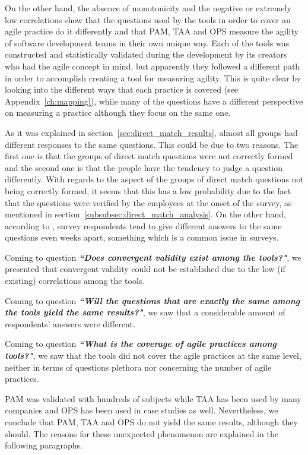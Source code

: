On the other hand, the absence of monotonicity and the negative or extremely low correlations show that the questions used by the tools in order to cover an agile practice do it differently and that \ac{PAM}, \ac{TAA} and \ac{OPS} measure the agility of software development teams in their own unique way. Each of the tools was constructed and statistically validated during the development by its creators who had the agile concept in mind, but apparently they followed a different path in order to accomplish creating a tool for measuring agility. This is quite clear by looking into the different ways that each practice is covered (see Appendix~\ref{ch:mapping}), while many of the questions have a different perspective on measuring a practice although they focus on the same one. 

As it was explained in section~\ref{sec:direct_match_results}, almost all groups had different responses to the same questions. This could be due to two reasons. The first one is that the groups of direct match questions were not correctly formed and the second one is that the people have the tendency to judge a question differently. With regards to the aspect of the groups of direct match questions not being correctly formed, it seems that this has a low probability due to the fact that the questions were verified by the employees at the onset of the survey, as mentioned in section~\ref{subsubsec:direct_match_analysis}. On the other hand, according to \citet{Lacy}, survey respondents tend to give different answers to the same questions even weeks apart, something which is a common issue in surveys.

Coming to question \textbf{\textit{``Does convergent validity exist among the tools?"}}, we presented that convergent validity could not be established due to the low (if existing) correlations among the tools.

Coming to question \textbf{\textit{``Will the questions that are exactly the same among the tools yield the same results?"}}, we saw that a considerable amount of respondents' answers were different.

Coming to question \textbf{\textit{``What is the coverage of agile practices among tools?"}}, we saw that the tools did not cover the agile practices at the same level, neither in terms of questions plethora nor concerning the number of agile practices.

\ac{PAM} was validated with hundreds of subjects while \ac{TAA} has been used by many companies and \ac{OPS} has been used in case studies as well. Nevertheless, we conclude that \ac{PAM}, \ac{TAA} and \ac{OPS} do not yield the same results, although they should. The reasons for these unexpected phenomenon are explained in the following paragraphs.

